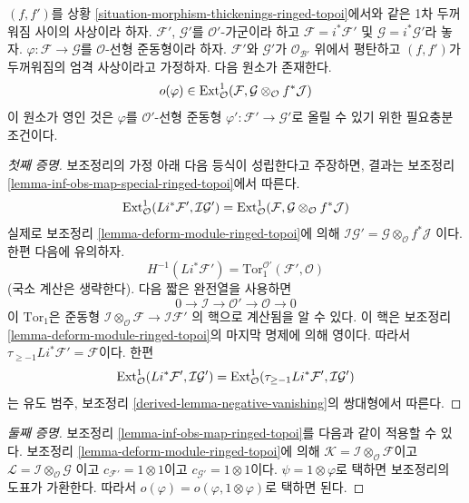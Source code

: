 \begin{lemma}
\label{lemma-inf-obs-map-rel-ringed-topoi}
$(f, f')$를 상황 \ref{situation-morphism-thickenings-ringed-topoi}에서와
같은 1차 두꺼워짐 사이의 사상이라 하자. $\mathcal{F}'$,
$\mathcal{G}'$를 $\mathcal{O}'$-가군이라 하고
$\mathcal{F} = i^*\mathcal{F}'$ 및 $\mathcal{G} = i^*\mathcal{G}'$라
놓자. $\varphi : \mathcal{F} \to \mathcal{G}$를 $\mathcal{O}$-선형
준동형이라 하자. $\mathcal{F}'$와 $\mathcal{G}'$가
$\mathcal{O}_{\mathcal{B}'}$ 위에서 평탄하고 $(f, f')$가 두꺼워짐의
엄격 사상이라고 가정하자. 다음 원소가 존재한다.
$$
o(\varphi) \in
\mathop{\mathrm{Ext}}\nolimits^1_\mathcal{O}(\mathcal{F},
\mathcal{G} \otimes_\mathcal{O} f^*\mathcal{J})
$$
이 원소가 영인 것은 $\varphi$를 $\mathcal{O}'$-선형 준동형
$\varphi' : \mathcal{F}' \to \mathcal{G}'$로 올릴 수 있기 위한
필요충분조건이다.
\end{lemma}

\begin{proof}[첫째 증명]
보조정리의 가정 아래 다음 등식이 성립한다고 주장하면, 결과는 보조정리
\ref{lemma-inf-obs-map-special-ringed-topoi}에서 따른다.
$$
\mathop{\mathrm{Ext}}\nolimits^1_\mathcal{O}(Li^*\mathcal{F}', \mathcal{I}\mathcal{G}') =
\mathop{\mathrm{Ext}}\nolimits^1_\mathcal{O}(\mathcal{F},
\mathcal{G} \otimes_\mathcal{O} f^*\mathcal{J})
$$
실제로 보조정리 \ref{lemma-deform-module-ringed-topoi}에 의해
$\mathcal{I}\mathcal{G}' =
\mathcal{G} \otimes_\mathcal{O} f^*\mathcal{J}$
이다. 한편 다음에 유의하자.
$$
H^{-1}(Li^*\mathcal{F}') =
\text{Tor}_1^{\mathcal{O}'}(\mathcal{F}', \mathcal{O})
$$
(국소 계산은 생략한다). 다음 짧은 완전열을 사용하면
$$
0 \to \mathcal{I} \to \mathcal{O}' \to \mathcal{O} \to 0
$$
이 $\text{Tor}_1$은 준동형
$\mathcal{I} \otimes_\mathcal{O} \mathcal{F} \to \mathcal{I}\mathcal{F}'$
의 핵으로 계산됨을 알 수 있다. 이 핵은 보조정리
\ref{lemma-deform-module-ringed-topoi}의 마지막 명제에 의해 영이다.
따라서 $\tau_{\geq -1}Li^*\mathcal{F}' = \mathcal{F}$이다. 한편
$$
\mathop{\mathrm{Ext}}\nolimits^1_\mathcal{O}(Li^*\mathcal{F}',
\mathcal{I}\mathcal{G}') =
\mathop{\mathrm{Ext}}\nolimits^1_\mathcal{O}(\tau_{\geq -1}Li^*\mathcal{F}',
\mathcal{I}\mathcal{G}')
$$
는 유도 범주, 보조정리
\ref{derived-lemma-negative-vanishing}의 쌍대형에서 따른다.
\end{proof}

\begin{proof}[둘째 증명]
보조정리 \ref{lemma-inf-obs-map-ringed-topoi}를 다음과 같이 적용할 수 있다.
보조정리 \ref{lemma-deform-module-ringed-topoi}에 의해
$\mathcal{K} = \mathcal{I} \otimes_\mathcal{O} \mathcal{F}$이고
$\mathcal{L} = \mathcal{I} \otimes_\mathcal{O} \mathcal{G}$
이고 $c_{\mathcal{F}'} = 1 \otimes 1$이고
$c_{\mathcal{G}'} = 1 \otimes 1$이다. $\psi = 1 \otimes \varphi$로
택하면 보조정리의 도표가 가환한다. 따라서
$o(\varphi) = o(\varphi, 1 \otimes \varphi)$로 택하면 된다.
\end{proof}

